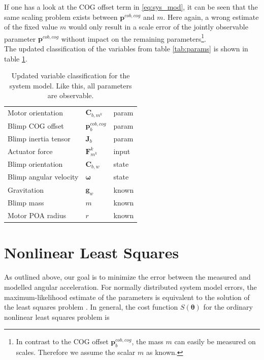 If one has a look at the COG offset term in \cref{eq:sys_mod}, it can be seen that the same scaling problem exists between $\mathbf{p}^{cob,cog}$ and $m$.
Here again, a wrong estimate of the fixed value $m$
would only result in a scale error of the jointly observable parameter $\mathbf{p}^{cob,cog}$ without impact on the remaining parameters\footnote{
In contrast to the COG offset $\mathbf{p}^{cob,cog}_{b}$, the mass $m$ can easily be measured on scales. Therefore we assume the scalar $m$ as known.}.
\\
The updated classification of the variables from table \ref{tab:params} is shown in table \ref{tab:params_updated}.

\begin{table}[htb!]
\captionsetup{width=0.9\textwidth}
\centering
\caption{Updated variable classification for the system model. Like this, all parameters are observable.}
\begin{tabular}{lll}
\hline
Motor orientation & $\mathbf{C}_{b,m^k}$ 	& param \\
Blimp COG offset & $\mathbf{p}^{cob,cog}_b$ & param \\
Blimp inertia tensor & $\mathbf{J}_b$ 		& param \\
Actuator force & $\mathbf{F}_{m^k}^k$ 			& input \\
Blimp orientation & $\mathbf{C}_{b,w}$ 		& state \\
Blimp angular velocity & $\boldsymbol{\omega}$ & state \\
Gravitation & $\mathbf{g}_w$ 				& known \\
Blimp mass & $m$ 							& known \\
Motor POA radius & $r$ 						& known \\
\hline
\end{tabular}
\label{tab:params_updated}
\end{table}

\section{Nonlinear Least Squares}
As outlined above, our goal is to minimize the error between the measured and modelled angular acceleration.
For normally distributed system model errors, the maximum-likelihood estimate of the parameters is equivalent to the solution of the least squares problem \citep{Seber}.
In general, the cost function $S(\boldsymbol{\theta})$ for the ordinary nonlinear least squares problem is

